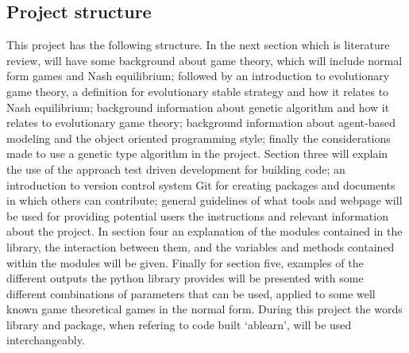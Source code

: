 \subsection{Project structure}
This project has the following structure. In the next section which is literature review, will have some background about game theory, which will include normal form games and Nash equilibrium; followed by an introduction to evolutionary game theory, a definition for evolutionary stable strategy and how it relates to Nash equilibrium; background information about genetic algorithm and how it relates to evolutionary game theory; background information about agent-based modeling and the object oriented programming style; finally the considerations made to use a genetic type algorithm in the project. Section three will explain the use of the approach test driven development for building code; an introduction to version control system Git for creating packages and documents in which others can contribute; general guidelines of what tools and webpage will be used for providing potential users the instructions and relevant information about the project. In section four an explanation of the modules contained in the library, the interaction between them, and the variables and methods contained within the modules will be given. Finally for section five, examples of the different outputs the python library provides will be presented with some different combinations of parameters that can be used, applied to some well known game theoretical games in the normal form. During this project the words library and package, when refering to code built `ablearn', will be used interchangeably. 
